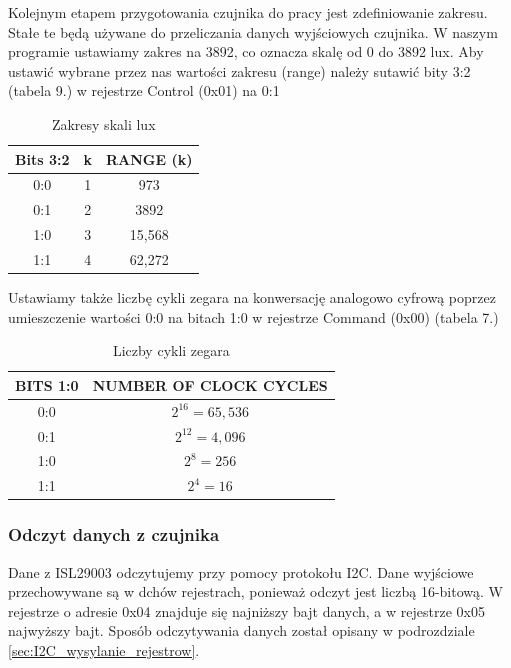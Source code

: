     Kolejnym etapem przygotowania czujnika do pracy jest zdefiniowanie zakresu. Stałe te będą używane do przeliczania danych wyjściowych czujnika. W naszym programie ustawiamy zakres na 3892, co oznacza skalę od 0 do 3892 lux. Aby ustawić wybrane przez nas wartości zakresu (range) należy sutawić bity 3:2 (tabela 9.) w rejestrze Control (0x01) na 0:1
    \begin{table}[H]
        \centering
        \begin{tabular}{|c|c|c|}
        \hline
        \rowcolor{gray!30}
        Bits 3:2 & k & RANGE (k)\\
        \hline
        0:0 & 1 & 973\\
        \hline
        0:1 & 2 & 3892\\
        \hline
        1:0 & 3 & 15,568\\
        \hline
        1:1 & 4 & 62,272\\
        \hline
        \end{tabular}
        \caption{Zakresy skali lux}
    \end{table}
    Ustawiamy także liczbę cykli zegara na konwersację analogowo cyfrową poprzez umieszczenie wartości 0:0 na bitach 1:0 w rejestrze Command (0x00) (tabela 7.)
    \begin{table}[H]
        \centering
        \begin{tabular}{|c|c|}
        \hline
        \rowcolor{gray!30}
        BITS 1:0 & NUMBER OF CLOCK CYCLES\\
        \hline
        0:0 & $2^{16} = 65,536$\\
        \hline
        0:1 & $2^{12} = 4,096$\\
        \hline
        1:0 & $2^{8} = 256$\\
        \hline
        1:1 & $2^{4} = 16$\\
        \hline
        \end{tabular}
        \caption{Liczby cykli zegara}
    \end{table}

    \subsubsection{Odczyt danych z czujnika}
    Dane z ISL29003 odczytujemy przy pomocy protokołu I2C. Dane wyjściowe przechowywane są w dchów rejestrach, ponieważ odczyt jest liczbą 16-bitową. W rejestrze o adresie 0x04 znajduje się najniższy bajt danych, a w rejestrze 0x05 najwyższy bajt. Sposób odczytywania danych został opisany w podrozdziale \ref{sec:I2C_wysylanie_rejestrow}.

